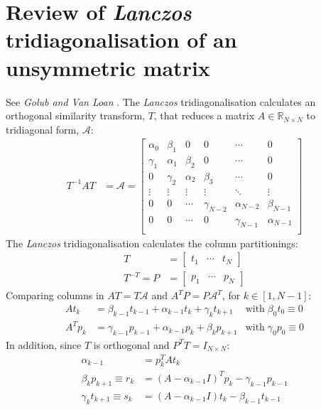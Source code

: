 \documentclass[a4paper,twoside,10pt,english]{report}
\begin{document}
\chapter{\label{app:Unsymmetric-Lanczos-tridiagonalisation}Review of \emph{Lanczos} tridiagonalisation of an unsymmetric matrix}
See \emph{Golub and Van Loan} 
\cite[Section 9.4.3]{GolubVanLoan_MatrixComputations}. The \emph{Lanczos} 
tridiagonalisation calculates an orthogonal similarity transform, $T$, that
reduces a matrix $A\in\mathbb{R}_{N\times{}N}$ to tridiagonal form, $\mathcal{A}$:
\begin{align*}
T^{-1}AT &= \mathcal{A} = \left[\begin{array}{cccccc}
\alpha_{0} & \beta_{1} & 0 & 0 & \cdots & 0\\
\gamma_{1} & \alpha_{1} & \beta_{2} & 0 & \cdots & 0 \\
0 & \gamma_{2} & \alpha_{2} & \beta_{3} & \cdots & 0 \\
\vdots & \vdots & \vdots & \vdots & \ddots & \vdots \\
0 & 0 & \cdots & \gamma_{N-2} & \alpha_{N-2} & \beta_{N-1}\\
0 & 0 & \cdots & 0 & \gamma_{N-1} & \alpha_{N-1}\\
\end{array}\right] 
\end{align*}
The \emph{Lanczos} tridiagonalisation calculates the column partitionings:
\begin{align*}
T &= 
\left[\begin{array}{ccc} t_{1} & \cdots & t_{N} \end{array}\right]\\
T^{-T} = P &= 
\left[\begin{array}{ccc} p_{1} & \cdots & p_{N} \end{array}\right]
\end{align*}
Comparing columns in $AT=T\mathcal{A}$ and $A^{T}P=P\mathcal{A}^{T}$, for 
$k\in\left[1,N-1\right]$:
\begin{align*}
At_{k} &= \beta_{k-1} t_{k-1} + \alpha_{k-1}t_{k} + \gamma_{k}t_{k+1}
& \text{with}\;\beta_{0}t_{0} \equiv 0\\
A^{T}p_{k} &= \gamma_{k-1}p_{k-1} + \alpha_{k-1}p_{k} + \beta_{k}p_{k+1}
& \text{with}\;\gamma_{0}p_{0} \equiv 0
\end{align*}
In addition, since $T$ is orthogonal and $P^{T}T=I_{N\times{}N}$:
\begin{align*}
\alpha_{k-1} &= p_{k}^{T}At_{k}\\
\beta_{k}p_{k+1}\equiv r_{k} &=
\left(A-\alpha_{k-1}I\right)^{T}p_{k}-\gamma_{k-1}p_{k-1}\\
\gamma_{k}t_{k+1}\equiv s_{k} &=
\left(A-\alpha_{k-1}I\right)t_{k}-\beta_{k-1}t_{k-1}\\
\end{align*}
\end{document}
